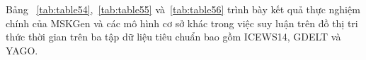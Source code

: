 Bảng ~\ref{tab:table54},~\ref{tab:table55} và~\ref{tab:table56} trình bày kết quả thực nghiệm chính của MSKGen và 
các mô hình cơ sở khác trong việc suy luận trên đồ thị tri thức thời gian trên ba tập dữ liệu tiêu chuẩn bao gồm 
ICEWS14, GDELT và YAGO.

\begin{table}
\caption{Kết quả thực nghiệm của MSKGen và các mô hình khác trên tập dữ liệu ICEWS14 với thiết lập bộ lọc nhận thức thời gian. 
Điểm số cao nhất được \textbf{bôi đen} và điểm số tốt thứ hai được \underline{gạch chân}.}
\label{tab:table54}
\begin{adjustbox}{width=\textwidth}

\end{adjustbox}
\end{table}
